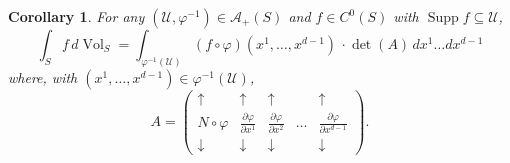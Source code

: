 \documentclass{article}
\newcommand\supp{\operatorname{Supp}}
\renewcommand\det{\operatorname{det}}
\newcommand{\p}{\partial}
\newcommand{\f}[2]{\frac{#1}{#2}}
\theoremstyle{theorem}
\newtheorem{corollary}[theorem]{Corollary}
\newcommand{\Vol}{\operatorname{Vol}}
\begin{document}
\begin{corollary}
For any $(\mathcal{U},\varphi^{-1})\in\mathcal{A}_+(S)$ and $f\in C^0(S)$ with $\supp{f} \subseteq \mathcal{U}$,
\begin{equation*}
    \int_S f\,d\Vol_S = \int_{\varphi^{-1}(\mathcal{U})} (f\circ \varphi)(x^1,\dots,x^{d-1})\, \cdot {\det{(A)}}\,dx^1\dots dx^{d-1} 
\end{equation*}
where, with $(x^1,\dots, x^{d-1}) \in \varphi^{-1}(\mathcal{U})$, 
\begin{equation*}
    A = 
    \begin{pmatrix}
    \uparrow &\uparrow & \uparrow &   &\uparrow \\ 
    N \circ \varphi &\f{\p \varphi}{\p x^1}& \f{\p \varphi}{\p x^2}  &\dots&\f{\p \varphi}{\p x^{d-1}}\\
    \downarrow  &\downarrow  & \downarrow &    &\downarrow 
    \end{pmatrix}.
\end{equation*}
\end{corollary}
\end{document}
